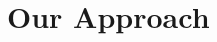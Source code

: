 \documentclass[10pt,twocolumn,nocopyrightspace]{sigplanconf}
\begin{document}





\section{Our Approach} \label{sec:fm}



\end{document}
